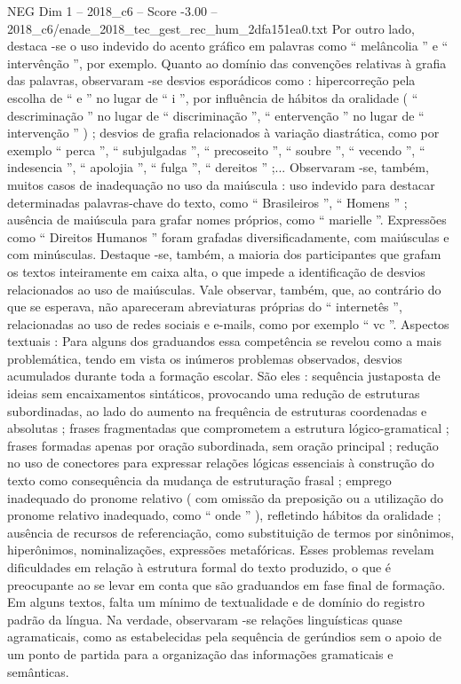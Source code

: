 \begin{textsample}{NEG Dim 1 – 2018\_c6 – Score -3.00 – 2018\_c6/enade\_2018\_tec\_gest\_rec\_hum\_2dfa151ea0.txt}
Por outro lado, destaca -se o uso indevido do acento gráfico em palavras como “ melâncolia ” e “ intervênção ”, por exemplo.
Quanto ao domínio das convenções relativas à grafia das palavras, observaram -se desvios esporádicos como : hipercorreção pela escolha de “ e ” no lugar de “ i ”, por influência de hábitos da oralidade ( “ descriminação ” no lugar de “ discriminação ”, “ entervenção ” no lugar de “ intervenção ” ) ; desvios de grafia relacionados à variação diastrática, como por exemplo “ perca ”, “ subjulgadas ”, “ precoseito ”, “ soubre ”, “ vecendo ”, “ indesencia ”, “ apolojia ”, “ fulga ”, “ dereitos ” ;...
Observaram -se, também, muitos casos de inadequação no uso da maiúscula : uso indevido para destacar determinadas palavras-chave do texto, como “ Brasileiros ”, “ Homens ” ; ausência de maiúscula para grafar nomes próprios, como “ marielle ”.
Expressões como “ Direitos Humanos ” foram grafadas diversificadamente, com maiúsculas e com minúsculas.
Destaque -se, também, a maioria dos participantes que grafam os textos inteiramente em caixa alta, o que impede a identificação de desvios relacionados ao uso de maiúsculas.
Vale observar, também, que, ao contrário do que se esperava, não apareceram abreviaturas próprias do “ internetês ”, relacionadas ao uso de redes sociais e e-mails, como por exemplo “ vc ”.
Aspectos textuais : Para alguns dos graduandos essa competência se revelou como a mais problemática, tendo em vista os inúmeros problemas observados, desvios acumulados durante toda a formação escolar.
São eles : sequência justaposta de ideias sem encaixamentos sintáticos, provocando uma redução de estruturas subordinadas, ao lado do aumento na frequência de estruturas coordenadas e absolutas ; frases fragmentadas que comprometem a estrutura lógico-gramatical ; frases formadas apenas por oração subordinada, sem oração principal ; redução no uso de conectores para expressar relações lógicas essenciais à construção do texto como consequência da mudança de estruturação frasal ; emprego inadequado do pronome relativo ( com omissão da preposição ou a utilização do pronome relativo inadequado, como “ onde ” ), refletindo hábitos da oralidade ; ausência de recursos de referenciação, como substituição de termos por sinônimos, hiperônimos, nominalizações, expressões metafóricas.
Esses problemas revelam dificuldades em relação à estrutura formal do texto produzido, o que é preocupante ao se levar em conta que são graduandos em fase final de formação.
Em alguns textos, falta um mínimo de textualidade e de domínio do registro padrão da língua.
Na verdade, observaram -se relações linguísticas quase agramaticais, como as estabelecidas pela sequência de gerúndios sem o apoio de um ponto de partida para a organização das informações gramaticais e semânticas.

\end{textsample}
